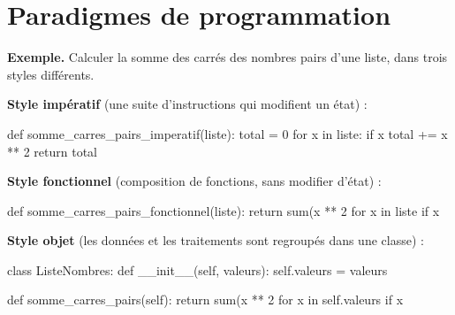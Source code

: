 
\section{Paradigmes de programmation}



\textbf{Exemple.} Calculer la somme des carrés des nombres pairs d'une liste, dans trois styles différents.

\textbf{Style impératif} (une suite d'instructions qui modifient un état) :
\begin{python}
def somme_carres_pairs_imperatif(liste):
    total = 0
    for x in liste:
        if x %
            total += x ** 2
    return total
\end{python}

\textbf{Style fonctionnel} (composition de fonctions, sans modifier d'état) :
\begin{python}
def somme_carres_pairs_fonctionnel(liste):
    return sum(x ** 2 for x in liste if x %
\end{python}

\textbf{Style objet} (les données et les traitements sont regroupés dans une classe) :
\begin{python}
class ListeNombres:
    def __init__(self, valeurs):
        self.valeurs = valeurs

    def somme_carres_pairs(self):
        return sum(x ** 2 for x in self.valeurs if x %
\end{python}

%
%
%

